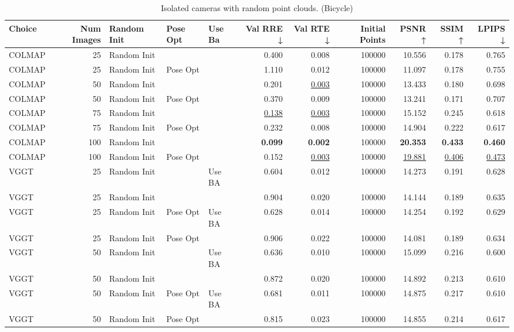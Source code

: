 \begin{table}[H]
\caption{Isolated cameras with random point clouds. (Bicycle)}
\label{tab:06_isolated_cams_num_points_bicycle}
\small
\begin{tabular}{lrlllrrrrrr}
\toprule
Choice & Num Images & Random Init & Pose Opt & Use Ba & Val RRE ↓ & Val RTE ↓ & Initial Points & PSNR ↑ & SSIM ↑ & LPIPS ↓ \\
\midrule
COLMAP & 25 & Random Init &  &  & 0.400 & 0.008 & 100000 & 10.556 & 0.178 & 0.765 \\
COLMAP & 25 & Random Init & Pose Opt &  & 1.110 & 0.012 & 100000 & 11.097 & 0.178 & 0.755 \\
COLMAP & 50 & Random Init &  &  & 0.201 & \underline{0.003} & 100000 & 13.433 & 0.180 & 0.698 \\
COLMAP & 50 & Random Init & Pose Opt &  & 0.370 & 0.009 & 100000 & 13.241 & 0.171 & 0.707 \\
COLMAP & 75 & Random Init &  &  & \underline{0.138} & \underline{0.003} & 100000 & 15.152 & 0.245 & 0.618 \\
COLMAP & 75 & Random Init & Pose Opt &  & 0.232 & 0.008 & 100000 & 14.904 & 0.222 & 0.617 \\
COLMAP & 100 & Random Init &  &  & \textbf{0.099} & \textbf{0.002} & 100000 & \textbf{20.353} & \textbf{0.433} & \textbf{0.460} \\
COLMAP & 100 & Random Init & Pose Opt &  & 0.152 & \underline{0.003} & 100000 & \underline{19.881} & \underline{0.406} & \underline{0.473} \\
VGGT & 25 & Random Init &  & Use BA & 0.604 & 0.012 & 100000 & 14.273 & 0.191 & 0.628 \\
VGGT & 25 & Random Init &  &  & 0.904 & 0.020 & 100000 & 14.144 & 0.189 & 0.635 \\
VGGT & 25 & Random Init & Pose Opt & Use BA & 0.628 & 0.014 & 100000 & 14.254 & 0.192 & 0.629 \\
VGGT & 25 & Random Init & Pose Opt &  & 0.906 & 0.022 & 100000 & 14.081 & 0.189 & 0.634 \\
VGGT & 50 & Random Init &  & Use BA & 0.636 & 0.010 & 100000 & 15.099 & 0.216 & 0.600 \\
VGGT & 50 & Random Init &  &  & 0.872 & 0.020 & 100000 & 14.892 & 0.213 & 0.610 \\
VGGT & 50 & Random Init & Pose Opt & Use BA & 0.681 & 0.011 & 100000 & 14.875 & 0.217 & 0.610 \\
VGGT & 50 & Random Init & Pose Opt &  & 0.815 & 0.023 & 100000 & 14.855 & 0.214 & 0.617 \\

\end{tabular}
\end{table}
